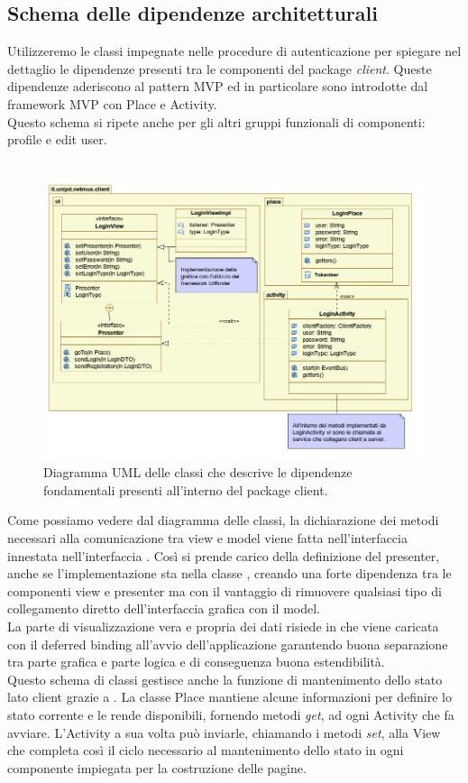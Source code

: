 \subsection*{Schema delle dipendenze architetturali}
Utilizzeremo le classi impegnate nelle procedure di autenticazione per spiegare
nel dettaglio le dipendenze presenti tra le componenti del package
\emph{client}. 
Queste dipendenze aderiscono al pattern MVP ed in particolare sono introdotte
dal framework MVP con Place e Activity.\\
Questo schema si ripete anche per gli altri gruppi funzionali di componenti:
profile e edit user.\\\\
\begin{figure}[h]
  \centering
  \includegraphics[width=16cm]{img/DP/package.png}
\caption{Diagramma UML delle classi che descrive le dipendenze
fondamentali presenti all'interno del package client.}
\end{figure}
Come possiamo vedere dal diagramma delle classi, la dichiarazione dei metodi
necessari alla comunicazione tra view e model viene fatta nell'interfaccia 
 innestata nell'interfaccia . Cos\`i 
si prende carico della definizione del presenter, anche se l'implementazione sta
nella classe , creando una forte dipendenza tra le componenti view e
presenter ma con il vantaggio di rimuovere qualsiasi tipo di collegamento
diretto dell'interfaccia grafica con il model.\\
La parte di visualizzazione vera e propria dei dati risiede in
 che viene caricata con il deferred binding all'avvio
dell'applicazione garantendo buona separazione tra parte grafica e parte logica
e di conseguenza buona estendibilit\`a.\\
Questo schema di classi gestisce
anche la funzione di mantenimento dello stato lato client grazie a
. La classe Place mantiene alcune informazioni per definire lo
stato corrente e le rende disponibili, fornendo metodi \emph{get}, ad ogni
Activity che fa avviare. L'Activity a sua volta pu\`o inviarle, chiamando i
metodi \emph{set}, alla View che completa cos\`i il ciclo necessario al
mantenimento dello stato in ogni componente impiegata per la costruzione delle pagine.

